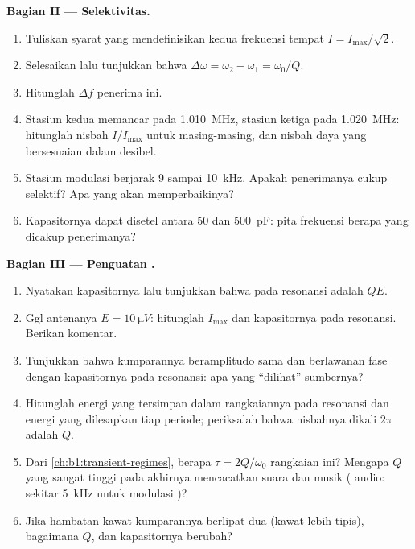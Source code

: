 \begin{problem}
\medskip
\noindent\textbf{Bagian II --- Selektivitas.}
\begin{enumerate}[resume]
  \item Tuliskan syarat yang mendefinisikan kedua frekuensi tempat
        $I = I_{\max}/\sqrt2$.
  \item Selesaikan lalu tunjukkan bahwa $\Delta\omega = \omega_2 - \omega_1 =
        \omega_0/Q$.
  \item Hitunglah  $\Delta f$ penerima ini.
  \item Stasiun kedua memancar pada \qty{1.010}{MHz}, stasiun ketiga
        pada \qty{1.020}{MHz}: hitunglah nisbah  $I/I_{\max}$
        untuk masing-masing, dan nisbah daya yang bersesuaian dalam desibel.
  \item Stasiun modulasi  berjarak \qty{9}{} sampai \qty{10}{kHz}. Apakah
        penerimanya cukup selektif? Apa yang akan memperbaikinya?
  \item Kapasitornya dapat disetel antara \qty{50}{} dan \qty{500}{pF}:
        pita frekuensi berapa yang dicakup penerimanya?
\end{enumerate}

\medskip
\noindent\textbf{Bagian III --- Penguatan .}
\begin{enumerate}[resume]
  \item Nyatakan   kapasitornya lalu tunjukkan
        bahwa pada resonansi  adalah $QE$.
  \item Ggl antenanya $E = \qty{10}{\micro V}$: hitunglah $I_{\max}$ dan
         kapasitornya pada resonansi. Berikan komentar.
  \item Tunjukkan bahwa  kumparannya beramplitudo sama dan
        berlawanan fase dengan  kapasitornya pada resonansi: apa
        yang ``dilihat'' sumbernya?
  \item Hitunglah energi yang tersimpan dalam rangkaiannya pada
        resonansi dan energi yang dilesapkan tiap periode; periksalah
        bahwa nisbahnya dikali $2\pi$ adalah $Q$.
  \item Dari \cref{ch:b1:transient-regimes}, berapa 
        $\tau = 2Q/\omega_0$ rangkaian ini? Mengapa $Q$ yang sangat
        tinggi pada akhirnya mencacatkan suara dan musik (
        audio: sekitar \qty{5}{kHz} untuk modulasi )?
  \item Jika hambatan kawat kumparannya berlipat dua (kawat lebih
        tipis), bagaimana $Q$,  dan  kapasitornya berubah?
\end{enumerate}


\end{problem}
